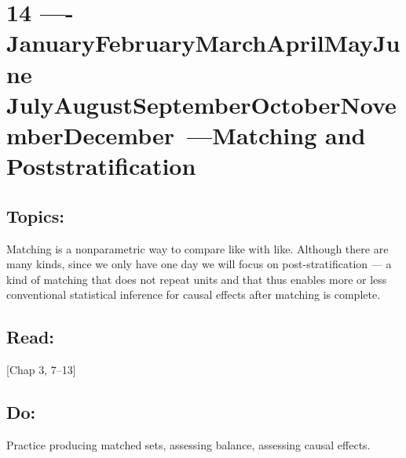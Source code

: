 \documentclass[10pt]{article}
\def\themonth{\ifcase\month\or
  January\or February\or March\or April\or May\or June\or
  July\or August\or September\or October\or November\or December\fi}
\begin{document}


\AdvanceDate[7]
\section{14 ----\themonth~\the\day---Matching and Poststratification}

\subsection{Topics:} Matching is a nonparametric way to compare like
with like. Although there are many kinds, since we only have one day we
will focus on post-stratification --- a kind of matching that does not
repeat units and that thus enables more or less conventional
statistical inference for causal effects after matching is complete.

\subsection{Read:}
\citealp{rosenbaum2010design}[Chap 3, 7--13]

\citealp{hansen:2004a}

\citealp{lu2011optimal}



\subsection{Do:} Practice producing matched sets, assessing balance,
assessing causal effects.


\end{document}
